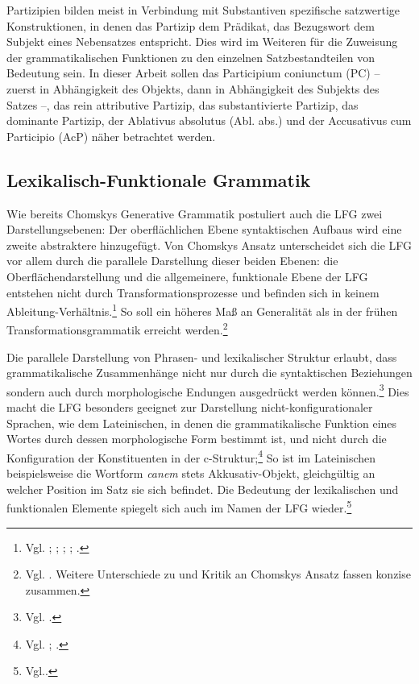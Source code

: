 \documentclass[12pt,a4paper]{article}
\begin{document}
Partizipien bilden meist in Verbindung mit Substantiven spezifische satzwertige Konstruktionen, in denen das Partizip dem Prädikat, das Bezugswort dem Subjekt eines Nebensatzes entspricht. Dies wird im Weiteren für die Zuweisung der grammatikalischen Funktionen zu den einzelnen Satzbestandteilen von Bedeutung sein.
In dieser Arbeit sollen das Participium coniunctum (PC) -- zuerst in Abhängigkeit des Objekts, dann in Abhängigkeit des Subjekts des Satzes --, das rein attributive Partizip, das substantivierte Partizip, das dominante Partizip, der Ablativus absolutus (Abl. abs.) und der Accusativus cum Participio (AcP) näher betrachtet werden.

\subsection{Lexikalisch-Funktionale Grammatik}
Wie bereits Chomskys Generative Grammatik postuliert auch die LFG zwei Darstellungsebenen: Der oberflächlichen Ebene syntaktischen Aufbaus wird eine zweite abstraktere hinzugefügt. Von Chomskys Ansatz unterscheidet sich die LFG vor allem durch die parallele Darstellung dieser beiden Ebenen: die Oberflächendarstellung und die allgemeinere, funktionale Ebene der LFG entstehen nicht durch Transformationsprozesse und befinden sich in keinem Ableitung-Verhältnis.\footnote{Vgl. \cite[64]{Falk}; \cite[8]{Skript}; \cite[2; 4; 7]{Dal}; \cite[3-4]{Bresnan}; \cite[11; 13]{Rohrer}.} So soll ein höheres Maß an Generalität als in der frühen Transformationsgrammatik erreicht werden.\footnote{Vgl. \cite[1-3; 9]{Dal}. Weitere Unterschiede zu und Kritik an Chomskys Ansatz fassen \cite[11]{Rohrer} konzise zusammen.}

Die parallele Darstellung von Phrasen- und lexikalischer Struktur erlaubt, dass grammatikalische Zusammenhänge nicht nur durch die syntaktischen Beziehungen sondern auch durch morphologische Endungen ausgedrückt werden können.\footnote{Vgl. \cite[10; 14]{Bresnan}.} Dies macht die LFG besonders geeignet zur Darstellung nicht-konfigurationaler Sprachen, wie dem Lateinischen, in denen die grammatikalische Funktion eines Wortes durch dessen morphologische Form bestimmt ist, und nicht durch die Konfiguration der Konstituenten in der c-Struktur;\footnote{Vgl. \cite[19]{Rohrer}; \cite[65]{Dal}.} So ist im Lateinischen beispielsweise die Wortform \textit{canem} stets Akkusativ-Objekt, gleichgültig an welcher Position im Satz sie sich befindet. Die Bedeutung der lexikalischen und funktionalen Elemente spiegelt sich auch im Namen der LFG wieder.\footnote{Vgl.\cite[3]{Dal}.}
\end{document}
